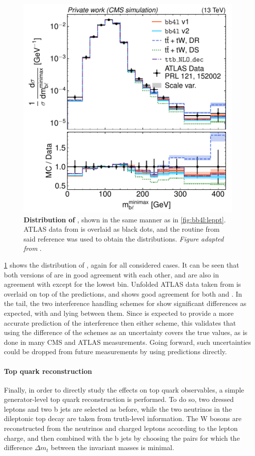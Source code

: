 \begin{figure}[tp]
    \centering
    \includegraphics[width=0.49 \textwidth]{figures/bb4l/generators/ATLAS_2018_I1677498_d03-x01-y01.pdf}
    \caption{\textbf{Distribution of \mblminimax}, shown in the same manner as in \cref{fig:bb4l:leppt}. ATLAS data from  is overlaid as black dots, and the \rivet routine from said reference was used to obtain the distributions. \textit{Figure adapted from }.}
    \label{fig:bb4l:mbl}
\end{figure}

\cref{fig:bb4l:mbl} shows the distribution of \mblminimax, again for all considered cases. It can be seen that both versions of \bbfourl are in good agreement with each other, and are also in agreement with \ttb except for the lowest bin. Unfolded ATLAS data taken from  is overlaid on top of the predictions, and shows good agreement for both \bbfourl and \ttb. 
In the tail, the two interference handling schemes for \tttWsum show significant differences as expected, with \bbfourl and \ttb lying between them. Since \bbfourl is expected to provide a more accurate prediction of the interference then either scheme, this validates that using the difference of the schemes as an uncertainty covers the true values, as is done in many CMS and ATLAS measurements. Going forward, such uncertainties could be dropped from future measurements by using \bbfourl predictions directly.

\paragraph{Top quark reconstruction} Finally, in order to directly study the effects on top quark observables, a simple generator-level top quark reconstruction is performed. To do so, two dressed leptons and two b jets are selected as before, while the two neutrinos in the dileptonic top decay are taken from truth-level information. The W bosons are reconstructed from the neutrinos and charged leptons according to the lepton charge, and then combined with the b jets by choosing the pairs for which the difference $\Delta m_t$ between the invariant masses is minimal. 

